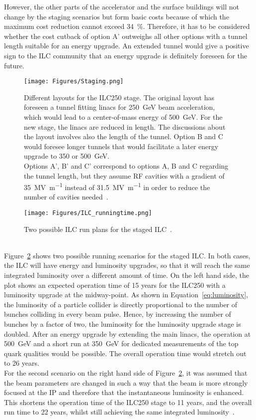 However, the other parts of the accelerator and the surface buildings will not change by the staging scenarios but form basic costs because of which the maximum cost reduction cannot exceed \SI{34}{\percent}.
Therefore, it has to be considered whether the cost cutback of option A' outweighs all other options with a tunnel length suitable for an energy upgrade.
An extended tunnel would give a positive sign to the ILC community that an energy upgrade is definitely foreseen for the future.
\begin{figure}
\centering
\texttt{[image: Figures/Staging.png]}
\caption[Different layouts for the ILC250 stage]{Different layouts for the ILC250 stage.
The original layout has foreseen a tunnel fitting linacs for \SI{250}{\GeV} beam acceleration, which would lead to a center-of-mass energy of \SI{500}{\GeV}.
For the new stage, the linacs are reduced in length.
The discussions about the layout involves also the length of the tunnel.
Option B and C would foresee longer tunnels that would facilitate a later energy upgrade to 350 or \SI{500}{\GeV}.\\
Options A', B' and C' correspond to options A, B and C regarding the tunnel length, but they assume RF cavities with a gradient of \SI{35}{\mega\volt\per\meter} instead of \SI{31.5}{\mega\volt\per\meter} in order to reduce the number of cavities needed~\cite[p. 19]{Staging}.}
\label{fig:Staging}
\end{figure}
\begin{figure}[h]
\centering
\texttt{[image: Figures/ILC\_runningtime.png]}
\caption[ILC run plan]{Two possible ILC run plans for the staged ILC~\cite[p. 8]{PhysicsCase}.}
\label{fig:ILC_runningtime}
\end{figure}
\\Figure~\ref{fig:ILC_runningtime} shows two possible running scenarios for the staged ILC.
In both cases, the ILC will have energy and luminosity upgrades, so that it will reach the same integrated luminosity over a different amount of time.
On the left hand side, the plot shows an expected operation time of 15 years for the ILC250 with a luminosity upgrade at the midway-point.
As shown in Equation~\ref{eq:luminosity}, the luminosity of a particle collider is directly proportional to the number of bunches colliding in every beam pulse.
Hence, by increasing the number of bunches by a factor of two, the luminosity for the luminosity upgrade stage is doubled.
After an energy upgrade by extending the main linacs, the operation at \SI{500}{\GeV} and a short run at \SI{350}{\GeV} for dedicated measurements of the top quark qualities would be possible.
The overall operation time would stretch out to 26 years.\\
For the second scenario on the right hand side of Figure~\ref{fig:ILC_runningtime}, it was assumed that the beam parameters are changed in such a way that the beam is more strongly focused at the IP and therefore that the instantaneous luminosity is enhanced.
This shortens the operation time of the ILC250 stage to 11 years, and the overall run time to 22 years, whilst still achieving the same integrated luminosity~\cite[p. 7]{PhysicsCase}.

